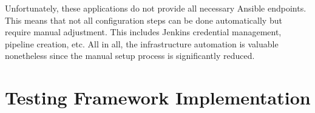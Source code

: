 Unfortunately, these applications do not provide all necessary Ansible endpoints. This means that not all configuration steps can be done automatically but require manual adjustment. This includes Jenkins credential management, pipeline creation, etc. All in all, the infrastructure automation is valuable nonetheless since the manual setup process is significantly reduced.

\section{Testing Framework Implementation} \label{sec:5-testing-implementation}


